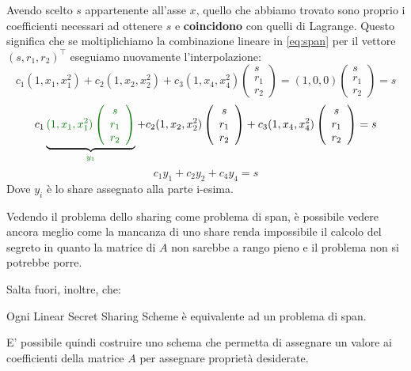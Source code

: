 \begin{remark}
Avendo scelto $s$ appartenente all'asse $x$, quello che abbiamo trovato sono proprio i coefficienti necessari ad ottenere $s$ e \textbf{coincidono} con quelli di Lagrange. Questo significa che se moltiplichiamo la combinazione lineare in \cref{eq:span} per il vettore $(s,r_1,r_2)^\top$ eseguiamo nuovamente l'interpolazione:
\[
c_1(1,x_1,x_1^2)+c_2(1,x_2,x_2^2)+c_3(1,x_4,x_4^2)\left(\begin{array}{c}
  s\\
  r_1\\
  r_2
\end{array}\right)=(1,0,0)\left(\begin{array}{c}
  s\\
  r_1\\
  r_2
\end{array}\right)=s
\]
\[c_1\underbrace{\textcolor{main}{(1,x_1,x_1^2)\left(\begin{array}{c}
  s\\
  r_1\\
  r_2
\end{array}\right)}}_{\textcolor{main}{y_1}}+c_2(1,x_2,x_2^2)\left(\begin{array}{c}
  s\\
  r_1\\
  r_2
\end{array}\right)+c_3(1,x_4,x_4^2)\left(\begin{array}{c}
  s\\
  r_1\\
  r_2
\end{array}\right)=s\]
\[c_1y_1+c_2y_2+c_4y_4=s\]
Dove $y_i$ è lo share assegnato alla parte i-esima.
\end{remark}
\begin{note}
Vedendo il problema dello sharing come problema di span, è possibile vedere ancora meglio come la mancanza di uno share renda impossibile il calcolo del segreto in quanto la matrice di $A$ non sarebbe a rango pieno e il problema non si potrebbe porre.
\end{note}
Salta fuori, inoltre, che:
\begin{theorem}[LSSS = MSP\footnotemark]
Ogni Linear Secret Sharing Scheme è equivalente ad un problema di span.
\end{theorem}
E' possibile quindi costruire uno schema che permetta di assegnare un valore ai coefficienti della matrice $A$ per assegnare proprietà desiderate.
